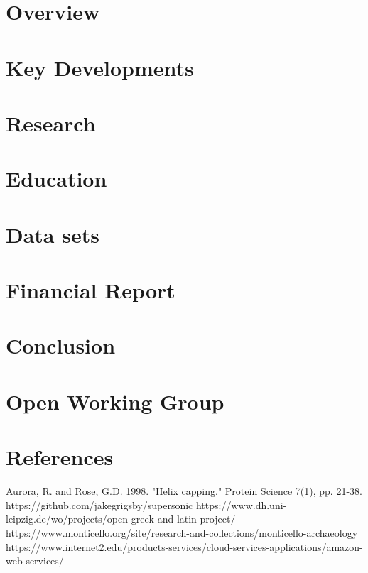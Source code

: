 \documentclass[12pt,letterpaper]{report} %
\begin{document}
\chapter{Overview} 
\chapter{Key Developments} 
\chapter{Research} 
\chapter{Education} 
\chapter{Data sets} 	
\chapter{Financial Report} 
\chapter{Conclusion}

\appendix
\chapter{Open Working Group}\label{chap:owg}
 

\chapter{References}
\begin{thebibliography}{99}
 Aurora, R. and Rose, G.D. 1998. "Helix capping." Protein Science 7(1), pp. 21-38.
 https://github.com/jakegrigsby/supersonic
 https://www.dh.uni-leipzig.de/wo/projects/open-greek-and-latin-project/
 https://www.monticello.org/site/research-and-collections/monticello-archaeology
 https://www.internet2.edu/products-services/cloud-services-applications/amazon-web-services/
\end{thebibliography}
\end{document}
